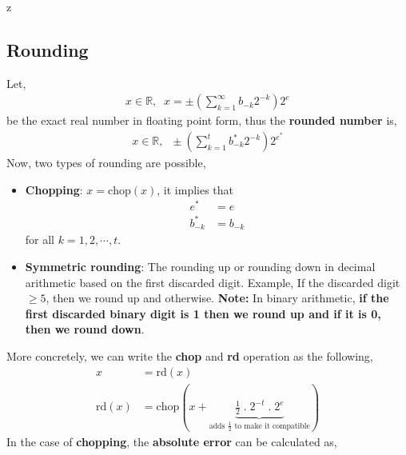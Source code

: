 z\documentclass[a4paper,12pt,twoside]{book}
\begin{document}
\subsection{Rounding}
Let,
\begin{equation*}
	\begin{split}
		x \in \mathbb{R},\;\; x = \pm \left( \sum_{k=1}^{\infty} b_{-k}2^{-k} \right) 2^{e}
	\end{split}
\end{equation*}
be the exact real number in floating point form, thus the \textbf{rounded number} is,
\begin{equation}
	\begin{split}
		\boxed{x\in \mathbb{R},\;\;\pm\left( \sum_{k=1}^{t} b^{*}_{-k}2^{-k} \right) 2^{e^{*}}}
	\end{split}
\end{equation}
Now, two types of rounding are possible,
\begin{itemize}
	\item {\textbf{Chopping}: $x=\text{chop}\left( x \right)$, it implies that 
		\begin{equation*}
			\begin{split}
				e^{*} &=  e\\
				b^{*}_{-k}&= b_{-k}
			\end{split}
		\end{equation*}
		for all $k = 1,2,\cdots,t$.
	}
\item{\textbf{Symmetric rounding}: The rounding up or rounding down in decimal arithmetic based on the first discarded digit. Example, If the discarded digit $\ge 5$, then we round up and otherwise.
\newline\newline
\textbf{Note: } In binary arithmetic, \textbf{if the first discarded binary digit is 1 then we round up and if it is 0, then we round down}.
	}
\end{itemize}
More concretely, we can write the \textbf{chop} and \textbf{rd} operation as the following,
\begin{equation}
	\begin{split}
		x &= \text{rd}\left( x \right)\\
		\text{rd}\left( x \right) &= \text{chop}\left( x + \underbrace{\frac{1}{2}\;.\;2^{-t}\;.\;2^{e}}_{ \text{adds $\frac{1}{2}$ to  make it compatible}} \right) 
	\end{split}
\end{equation}
In the case of \textbf{chopping}, the \textbf{absolute error} can be calculated as,
\end{document}
